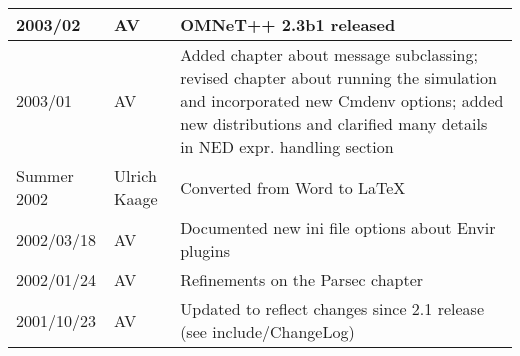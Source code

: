 \begin{longtable}{|l|p{1cm}|p{10cm}|}
2003/02 & AV & OMNeT++ 2.3b1 released\\\hline
2003/01 & AV & Added chapter about message subclassing; revised chapter about
               running the simulation and incorporated new Cmdenv options; added new
               distributions and clarified many details in NED expr. handling section\\\hline
Summer 2002 & Ulrich Kaage & Converted from Word to LaTeX\\\hline
2002/03/18 & AV & Documented new ini file options about Envir plugins\\\hline
2002/01/24 & AV & Refinements on the Parsec chapter\\\hline
2001/10/23 & AV & Updated to reflect changes since 2.1 release (see include/ChangeLog)\\\hline
\end{longtable}





